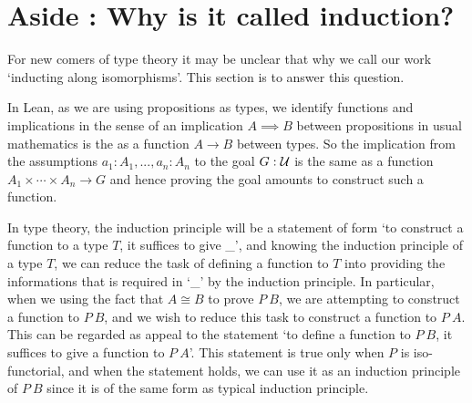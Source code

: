 \documentclass[11pt]{article}
\begin{document}
\section{Aside : Why is it called induction?}

For new comers of type theory it may be unclear that why we call our work `inducting along isomorphisms'. This section is to answer this question.

In Lean, as we are using propositions as types, we identify functions and implications in the sense of an implication $A\implies B$ between propositions in usual mathematics is the as a function $A \to B$ between types. So the implication from the assumptions $a_1 : A_1,...,a_n:A_n$ to the goal $G:\cal U$ is the same as a function $A_1\times\cdots\times A_n\to G$ and hence proving the goal amounts to construct such a function.

In type theory, the induction principle will be a statement of form `to construct a function to a type $T$, it suffices to give \_', and knowing the induction principle of a type $T$, we can reduce the task of defining a function to $T$ into providing the informations that is required in `\_' by the induction principle. In particular, when we using the fact that $A\cong B$ to prove $P \ B$, we are attempting to construct a function to $P \ B$, and we wish to reduce this task to construct a function to $P \ A$. This can be regarded as appeal to the statement `to define a function to $P \ B$, it suffices to give a function to $P \ A$'. This statement is true only when $P$ is iso-functorial, and when the statement holds, we can use it as an induction principle of $P \ B$ since it is of the same form as typical induction principle.
\end{document}
